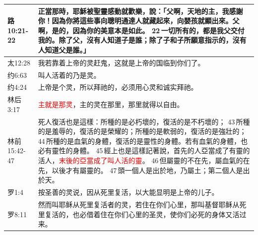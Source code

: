 \begin{table}[H]
\begin{tabular}{p{5em}p{42em}}
路10:21-22&正當那時，耶穌被聖靈感動就歡樂，說：「父啊，天地的主，我感謝你！因為你將這些事向聰明通達人就藏起來，向嬰孩就顯出來。父啊，是的，因為你的美意本是如此。 22 一切所有的，都是我父交付我的。除了父，沒有人知道子是誰；除了子和子所願意指示的，沒有人知道父是誰。」\\  \midrule

太12:28&我若靠着上帝的灵赶鬼，这就是上帝的国临到你们了。\\  \midrule

约6:63&叫人活着的乃是灵。\\  \midrule
约4:24&上帝是个灵，所以拜祂的，必须用心灵和诚实拜祂。\\  \midrule
林后3:17&\textcolor{red}{主就是那灵}，主的灵在那里，那里就得以自由。\\  \midrule
林前15:42-47&死人復活也是這樣：所種的是必朽壞的，復活的是不朽壞的； 43 所種的是羞辱的，復活的是榮耀的；所種的是軟弱的，復活的是強壯的； 44 所種的是血氣的身體，復活的是靈性的身體。若有血氣的身體，也必有靈性的身體。 45 經上也是這樣記著說，首先的人亞當成了有靈的活人，\textcolor{red}{末後的亞當成了叫人活的靈}。 46 但屬靈的不在先，屬血氣的在先，以後才有屬靈的。 47 頭一個人是出於地，乃屬土；第二個人是出於天。\\  \midrule

罗1:4&按圣善的灵说，因从死里复活，以大能显明是上帝的儿子。\\  \midrule
罗8:11&然而叫耶稣从死里复活者的灵，若住在你们心里，那叫基督耶稣从死里复活的，也必借着住在你们心里的圣灵，使你们必死的身体又活过来。\\  \midrule

\end{tabular}%
\end{table}









